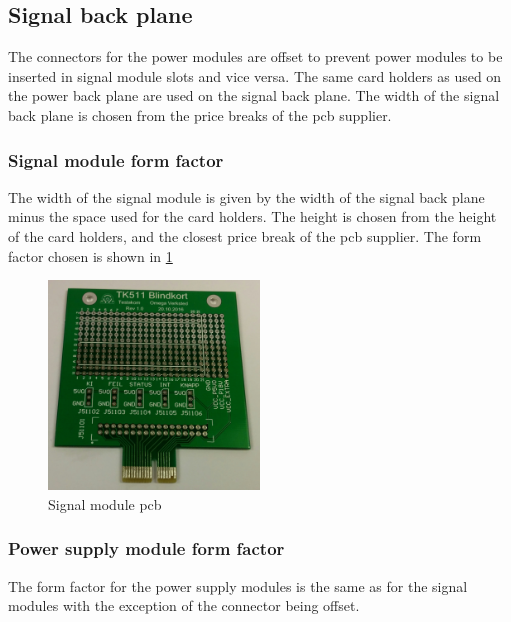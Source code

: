 \subsection{Signal back plane}
The connectors for the power modules are offset to prevent power modules to be inserted in signal module slots and vice versa. The same card holders as used on the power back plane are used on the signal back plane. The width of the signal back plane is chosen from the price breaks of the pcb supplier.


\subsubsection{Signal module form factor}
The width of the signal module is given by the width of the signal back plane minus the space used for the card holders. The height is chosen from the height of the card holders, and the closest price break of the pcb supplier. The form factor chosen is shown in \cref{fig:tk511_img}
\begin{figure}
    \centering
    \includegraphics[width=0.5\textwidth]{img/TK511_Blindkort.jpg}
    \caption{Signal module pcb}
    \label{fig:tk511_img}
\end{figure}

\subsubsection{Power supply module form factor}
The form factor for the power supply modules is the same as for the signal modules with the exception of the connector being offset.

